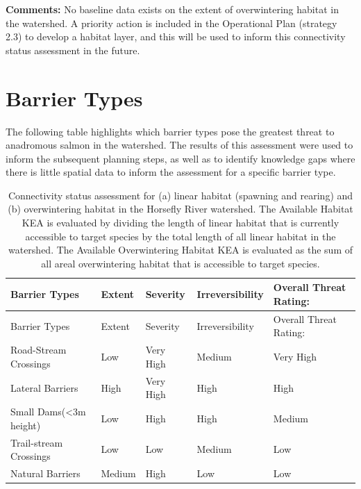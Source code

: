 \documentclass[
  letterpaper,
  DIV=11,
  numbers=noendperiod]{scrreprt}
\begin{document}
\textbf{Comments:} No baseline data exists on the extent of
overwintering habitat in the watershed. A priority action is included in
the Operational Plan (strategy 2.3) to develop a habitat layer, and this
will be used to inform this connectivity status assessment in the
future.

\hypertarget{barrier-types}{%
\section*{Barrier Types}\label{barrier-types}}


The following table highlights which barrier types pose the greatest
threat to anadromous salmon in the watershed. The results of this
assessment were used to inform the subsequent planning steps, as well as
to identify knowledge gaps where there is little spatial data to inform
the assessment for a specific barrier type.

\hypertarget{tbl-barriertype}{}
\begin{longtable}[]{@{}lllll@{}}
\caption{\label{tbl-barriertype}Connectivity status assessment for (a)
linear habitat (spawning and rearing) and (b) overwintering habitat in
the Horsefly River watershed. The Available Habitat KEA is evaluated by
dividing the length of linear habitat that is currently accessible to
target species by the total length of all linear habitat in the
watershed. The Available Overwintering Habitat KEA is evaluated as the
sum of all areal overwintering habitat that is accessible to target
species.}\label{T_6be6e_}\tabularnewline
\toprule\noalign{}
Barrier Types & Extent & Severity & Irreversibility & Overall Threat
Rating: \\
\midrule\noalign{}
\endfirsthead
\toprule\noalign{}
Barrier Types & Extent & Severity & Irreversibility & Overall Threat
Rating: \\
\midrule\noalign{}
\endhead
\bottomrule\noalign{}
\endlastfoot
Road-Stream Crossings & Low & Very High & Medium & Very High \\
Lateral Barriers & High & Very High & High & High \\
Small Dams(\textless3m height) & Low & High & High & Medium \\
Trail-stream Crossings & Low & Low & Medium & Low \\
Natural Barriers & Medium & High & Low & Low \\
\end{longtable}
\end{document}
